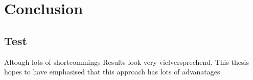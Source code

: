\chapter{Conclusion}
\section{Test}
Altough lots of shortcommings
Results look very vielversprechend. This thesis hopes to have emphasised that this approach has lots of advanatages